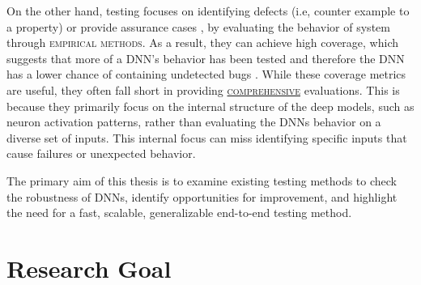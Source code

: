 On the other hand, testing focuses on identifying defects (i.e, counter example to a property) or provide assurance cases \cite {Rushby}, by evaluating the behavior of system through {\textsc{empirical methods.}} \label{empirical methods} As a result, they can achieve high coverage, which suggests that more of a DNN's behavior has been tested and therefore the DNN has a lower chance of containing undetected bugs \cite{HuangX}. While these coverage metrics are useful, they often fall short in providing \hyperref[gloss]{\textsc{comprehensive}}\label{comprehensive} evaluations. This is because they primarily focus on the internal structure of the deep models, such as neuron activation patterns, rather than evaluating the DNNs behavior on a diverse set of inputs. This internal focus can miss identifying specific inputs that cause failures or unexpected behavior.


\begin{tcolorbox}[colback=purple!2!white, colframe=purple,title= Thesis Goal]

    The primary aim of this thesis is to examine existing testing methods to check the robustness of DNNs, identify opportunities for improvement, and highlight the need for a fast, scalable, generalizable end-to-end testing method.
    \end{tcolorbox}
    






\section{Research Goal}


